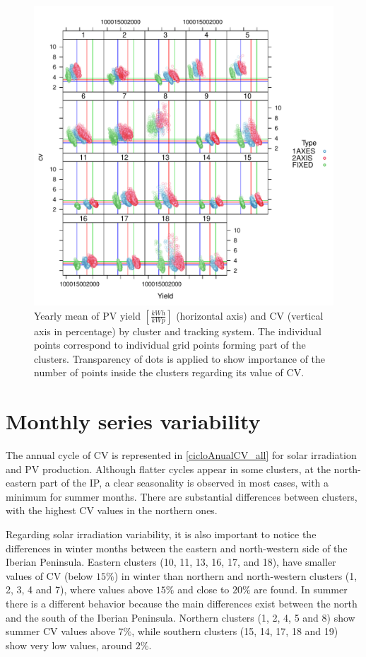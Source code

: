 \begin{subappendices}
\begin{figure}[!tbp]
  \includegraphics[width=\textwidth]{figs/capitulo5/Yearlycv_productivity3.pdf}
  \caption{Yearly mean of PV yield $[\frac{kWh}{kWp}]$ (horizontal axis) and CV (vertical axis in percentage) by cluster and tracking system. The individual points correspond to individual grid points forming part of the clusters. Transparency of dots is applied to show importance of the number of points inside the clusters regarding its value of CV.}
  \label{yearly_productivity_and_CV}
\end{figure}

\section{Monthly series variability}


The annual cycle of CV is represented in \ref{cicloAnualCV_all} for solar irradiation and PV production. Although flatter cycles appear in some clusters, at the north-eastern part of the IP, a clear seasonality is observed in most cases, with a minimum for summer months. There are substantial differences between clusters, with the highest CV values in the northern ones.

Regarding solar irradiation variability, it is also important to notice the differences in winter months between the eastern and north-western side of the Iberian Peninsula. Eastern clusters (10, 11, 13, 16, 17, and 18), have smaller values of CV (below $15\%$) in winter than northern and north-western clusters (1, 2, 3, 4 and 7), where values above $15\%$ and close to $20\%$ are found. In summer there is a different behavior because the main differences exist between the north and the south of the Iberian Peninsula. Northern clusters (1, 2, 4, 5 and 8) show summer CV values above $7\%$, while southern clusters (15, 14, 17, 18 and 19) show very low values, around $2\%$.


\end{subappendices}
